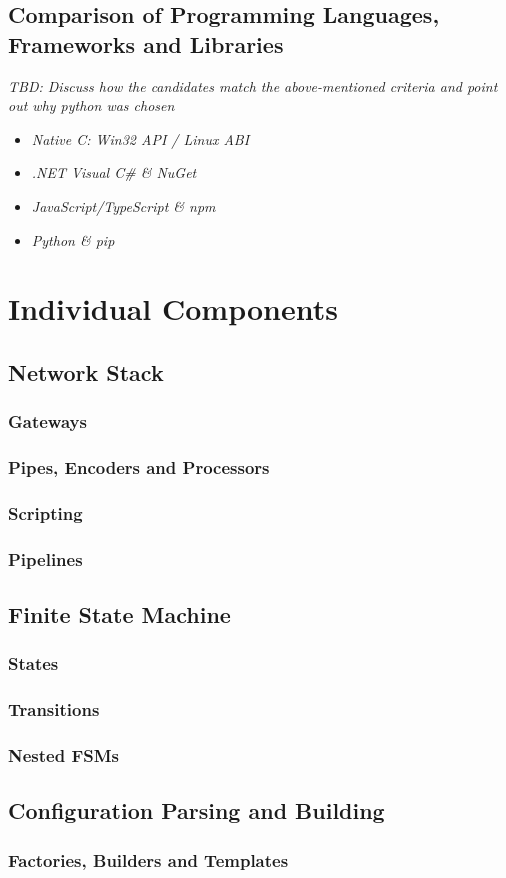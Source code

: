 \subsection{Comparison of Programming Languages, Frameworks and Libraries}
\emph{TBD: Discuss how the candidates match the above-mentioned criteria and point out why python was chosen} %
\begin{itemize}
    \item \emph{Native C: Win32 API / Linux ABI}
    \item \emph{.NET Visual C\# \& NuGet}
    \item \emph{JavaScript/TypeScript \& npm}
    \item \emph{Python \& pip}
\end{itemize}

\section{Individual Components}
\label{sec:individual-components}

\subsection{Network Stack}
\subsubsection{Gateways}
\subsubsection{Pipes, Encoders and Processors}
\subsubsection{Scripting}
\subsubsection{Pipelines}

\subsection{Finite State Machine}
\subsubsection{States}
\subsubsection{Transitions}
\subsubsection{Nested \acp{FSM}}

\subsection{Configuration Parsing and Building}
\subsubsection{Factories, Builders and Templates}